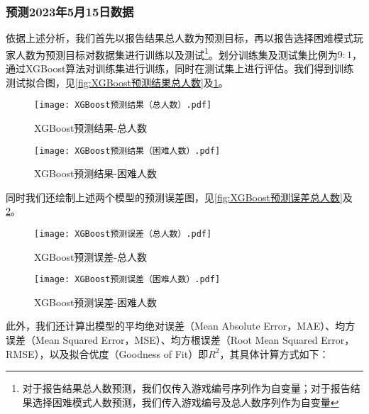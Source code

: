 \documentclass{MathModeling}
\begin{document}
	\subsubsection{预测2023年5月15日数据}
	依据上述分析，我们首先以报告结果总人数为预测目标，再以报告选择困难模式玩家人数为预测目标对数据集进行训练以及测试\textcolor{blue}{\footnote{对于报告结果总人数预测，我们仅传入游戏编号序列作为自变量；对于报告结果选择困难模式人数预测，我们传入游戏编号及总人数序列作为自变量}}。划分训练集及测试集比例为$9:1$，通过XGBoost算法对训练集进行训练，同时在测试集上进行评估。我们得到训练测试拟合图，见\textcolor{blue}{\cref{fig:XGBoost预测结果总人数}}及\textcolor{blue}{\cref{fig:XGBoost预测结果困难人数}}。
	\begin{figure}[H]
		\centering
		\begin{minipage}{0.48\linewidth}
			\centering
			\texttt{[image: XGBoost预测结果（总人数）.pdf]}
			\caption{XGBoost预测结果-总人数}
			\label{fig:XGBoost预测结果总人数}
		\end{minipage}
		\begin{minipage}{0.48\linewidth}
			\centering
			\texttt{[image: XGBoost预测结果（困难人数）.pdf]}
			\caption{XGBoost预测结果-困难人数}
			\label{fig:XGBoost预测结果困难人数}
		\end{minipage}
	\end{figure}
	同时我们还绘制上述两个模型的预测误差图，见\textcolor{blue}{\cref{fig:XGBoost预测误差总人数}}及\textcolor{blue}{\cref{fig:XGBoost预测误差困难人数}}。
	\begin{figure}[H]
		\centering
		\begin{minipage}{0.48\linewidth}
			\centering
			\texttt{[image: XGBoost预测误差（总人数）.pdf]}
			\caption{XGBoost预测误差-总人数}
			\label{fig:XGBoost预测误差总人数}
		\end{minipage}
		\begin{minipage}{0.48\linewidth}
			\centering
			\texttt{[image: XGBoost预测误差（困难人数）.pdf]}
			\caption{XGBoost预测误差-困难人数}
			\label{fig:XGBoost预测误差困难人数}
		\end{minipage}
	\end{figure}
	此外，我们还计算出模型的平均绝对误差（Mean Absolute Error，MAE）、均方误差（Mean Squared Error，MSE）、均方根误差（Root Mean Squared Error，RMSE），以及拟合优度（Goodness of Fit）即$R^2$，其具体计算方式如下：
\end{document}
